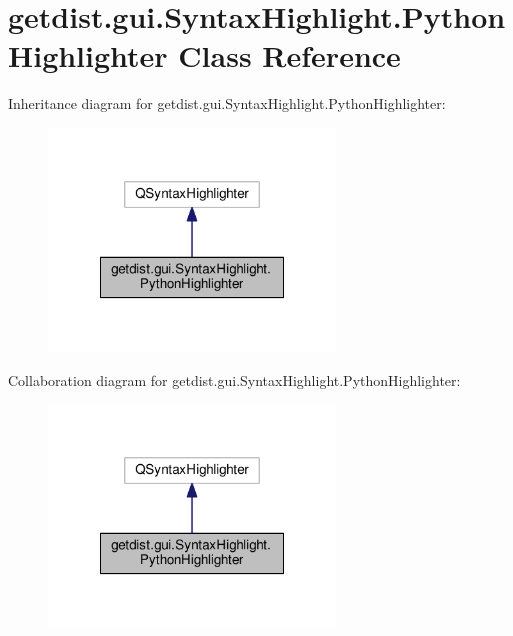 \hypertarget{classgetdist_1_1gui_1_1SyntaxHighlight_1_1PythonHighlighter}{}\section{getdist.\+gui.\+Syntax\+Highlight.\+Python\+Highlighter Class Reference}
\label{classgetdist_1_1gui_1_1SyntaxHighlight_1_1PythonHighlighter}


Inheritance diagram for getdist.\+gui.\+Syntax\+Highlight.\+Python\+Highlighter\+:
\nopagebreak
\begin{figure}[H]
\begin{center}
\leavevmode
\includegraphics[width=216pt]{classgetdist_1_1gui_1_1SyntaxHighlight_1_1PythonHighlighter__inherit__graph}
\end{center}
\end{figure}


Collaboration diagram for getdist.\+gui.\+Syntax\+Highlight.\+Python\+Highlighter\+:
\nopagebreak
\begin{figure}[H]
\begin{center}
\leavevmode
\includegraphics[width=216pt]{classgetdist_1_1gui_1_1SyntaxHighlight_1_1PythonHighlighter__coll__graph}
\end{center}
\end{figure}
